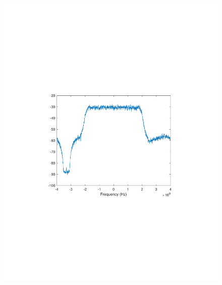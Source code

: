 \begin{refsection}
\begin{figure}[H]
	\centering
	\begin{minipage}{0.30\textwidth}
		\centering
		\includegraphics[clip, trim=4cm 8cm 4cm 8cm, width=1\textwidth]{./sdf/m_qam_system/figures/expResults/intradyne/5_4GBdInSig13dB_AfPE1.pdf}
		\label{fig:4GBdEyePE1}
	\end{minipage}
	\begin{minipage}{0.30\textwidth}
		\centering

\end{minipage}
\end{figure}
\end{refsection}
